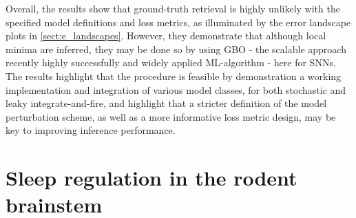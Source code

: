 \documentclass[mphil,deptreport,ianc]{infthesis} %
\begin{document}
Overall, the results show that ground-truth retrieval is highly unlikely with the specified model definitions and loss metrics, as illuminated by the error landscape plots in \ref{sect:e_landscapes}.
However, they demonstrate that although local minima are inferred, they may be done so by using GBO - the scalable approach recently highly successfully and widely applied ML-algorithm - here for SNNs.
The results highlight that the procedure is feasible by demonstration a working implementation and integration of various model classes, for both stochastic and leaky integrate-and-fire, and highlight that a stricter definition of the model perturbation scheme, as well as a more informative loss metric design, may be key to improving inference performance.


\chapter{Sleep regulation in the rodent brainstem}\label{chpt:sleep}
\end{document}
